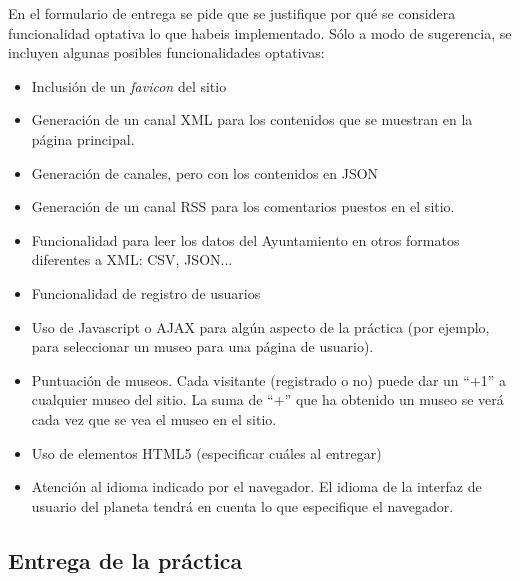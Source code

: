 En el formulario de entrega se pide que se justifique por qué se considera funcionalidad optativa lo que habeis implementado. Sólo a modo de sugerencia, se incluyen algunas posibles funcionalidades optativas:

\begin{itemize}
  \item Inclusión de un \emph{favicon} del sitio
  
  \item Generación de un canal XML para los contenidos que se muestran en la página principal.

  \item Generación de canales, pero con los contenidos en JSON

  \item Generación de un canal RSS para los comentarios puestos en el sitio.
  
  \item Funcionalidad para leer los datos del Ayuntamiento en otros formatos diferentes a XML: CSV, JSON...
  
  \item Funcionalidad de registro de usuarios
  
  \item Uso de Javascript o AJAX para algún aspecto de la práctica (por ejemplo, para seleccionar un museo para una página de usuario).

  \item Puntuación de museos. Cada visitante (registrado o no) puede dar un ``+1'' a cualquier museo del sitio. La suma de ``+'' que ha obtenido un museo se verá cada vez que se vea el museo en el sitio.
  
  \item Uso de elementos HTML5 (especificar cuáles al entregar)

  \item Atención al idioma indicado por el navegador. El idioma de la interfaz de usuario del planeta tendrá en cuenta lo que especifique el navegador.

\end{itemize}


\subsection{Entrega de la práctica}

